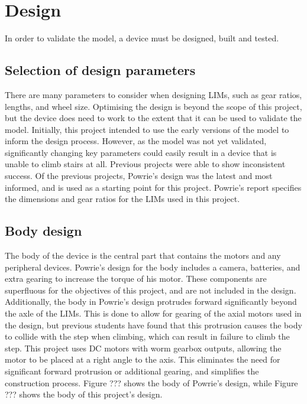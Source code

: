 \chapter{Design}

In order to validate the model, a device must be designed, built and tested. 

\section{Selection of design parameters}
There are many parameters to consider when designing LIMs, such as gear ratios, lengths, and wheel size. Optimising the design is beyond the scope of this project, but the device does need to work to the extent that it can be used to validate the model. Initially, this project intended to use the early versions of the model to inform the design process. However, as the model was not yet validated, significantly changing key parameters could easily result in a device that is unable to climb stairs at all. Previous projects were able to show inconsistent success. Of the previous projects, Powrie's design was the latest and most informed, and is used as a starting point for this project. Powrie's report specifies the dimensions and gear ratios for the LIMs used in this project.\\

\section{Body design}
The body of the device is the central part that contains the motors and any peripheral devices.
Powrie's design for the body includes a camera, batteries, and extra gearing to increase the torque of his motor. These components are superfluous for the objectives of this project, and are not included in the design. Additionally, the body in Powrie's design protrudes forward significantly beyond the axle of the LIMs. This is done to allow for gearing of the axial motors used in the design, but previous students have found that this protrusion causes the body to collide with the step when climbing, which can result in failure to climb the step. This project uses DC motors with worm gearbox outputs, allowing the motor to be placed at a right angle to the axis. This eliminates the need for significant forward protrusion or additional gearing, and simplifies the construction process. Figure ??? shows the body of Powrie's design, while Figure ??? shows the body of this project's design.

